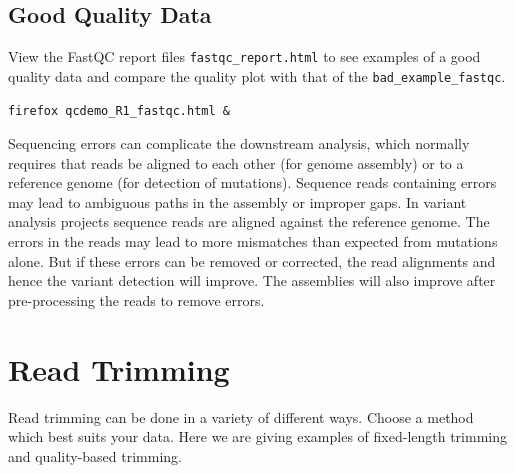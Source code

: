 \begin{bonus}
\subsection{Good Quality Data}
View the FastQC report files \texttt{fastqc\_report.html} to see examples of a good
quality data and compare the quality plot with that of the \texttt{bad\_example\_fastqc}.

\begin{lstlisting}
firefox qcdemo_R1_fastqc.html &
\end{lstlisting}
\end{bonus}

\begin{note}
Sequencing errors can complicate the downstream analysis, which normally
requires that reads be aligned to each other (for genome assembly) or to a
reference genome (for detection of mutations). Sequence reads containing errors
may lead to ambiguous paths in the assembly or improper gaps. In variant
analysis projects sequence reads are aligned against the reference genome. The
errors in the reads may lead to more mismatches than expected from
mutations alone. But if these errors can be removed or corrected, the read
alignments and hence the variant detection will improve. The assemblies will also
improve after pre-processing the reads to remove errors.
\end{note}

\section{Read Trimming}
Read trimming can be done in a variety of different ways. Choose a method
which best suits your data. Here we are giving examples of fixed-length trimming
and quality-based trimming.



